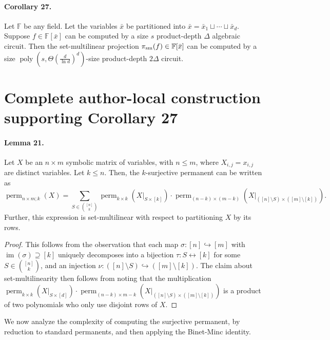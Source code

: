 \paragraph{Corollary 27.} Let $\mathbb F$ be any field. Let the variables $\bar x$ be partitioned into $\bar x=\bar x_1\sqcup\cdots\sqcup\bar x_d$. Suppose $f\in\mathbb F[\bar x]$ can be computed by a size $s$ product-depth $\Delta$ algebraic circuit. Then the set-multilinear projection $\pi_{\rm sm}(f)\in\mathbb F[\bar x]$ can be computed by a size $\operatorname{poly}(s,\Theta(\frac d{\ln d})^d)$-size product-depth $2\Delta$ circuit.
\section*{Complete author-local construction supporting Corollary 27}
\paragraph{Lemma 21.} Let $X$ be an $n\times m$ symbolic matrix of variables, with $n\le m$, where $X_{i,j}=x_{i,j}$ are distinct variables. Let $k\le n$. Then, the $k$-surjective permanent can be written as
\[\operatorname{perm}_{n\times m;k}(X)=\sum_{S\in\binom{[n]}k}\operatorname{perm}_{k\times k}(X|_{S\times[k]})\cdot\operatorname{perm}_{(n-k)\times(m-k)}(X|_{([n]\setminus S)\times([m]\setminus[k])}).\]
Further, this expression is set-multilinear with respect to partitioning $X$ by its rows.
\begin{proof}
This follows from the observation that each map $\sigma:[n]\hookrightarrow[m]$ with $\operatorname{im}(\sigma)\supseteq[k]$ uniquely decomposes into a bijection $\tau:S\leftrightarrow[k]$ for some $S\in\binom{[n]}k$, and an injection $\nu:([n]\setminus S)\hookrightarrow([m]\setminus[k])$.
The claim about set-multilinearity then follows from noting that the multiplication $\operatorname{perm}_{k\times k}(X|_{S\times[d]})\cdot\operatorname{perm}_{(n-k)\times m-k}(X|_{([n]\setminus S)\times([m]\setminus[k])})$ is a product of two polynomials who only use disjoint rows of $X$.
\end{proof}
We now analyze the complexity of computing the surjective permanent, by reduction to standard permanents, and then applying the Binet-Minc identity.
